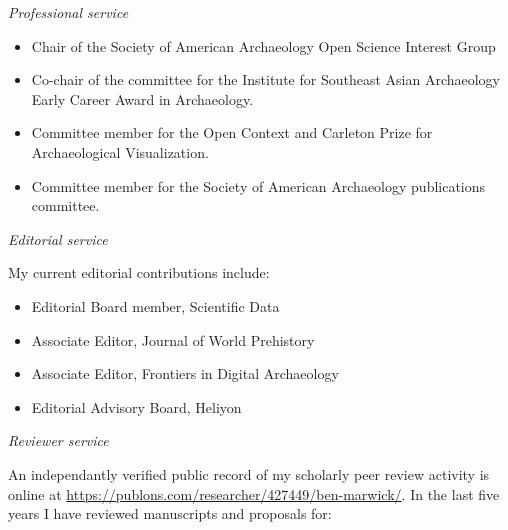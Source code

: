 \medskip

\noindent\emph{Professional service\vspace{0.01in}}

\medskip

\begin{itemize}[noitemsep, font=$\bullet$\scshape\bfseries]

\item Chair of the Society of American Archaeology Open Science Interest Group

\item Co-chair of the committee for the Institute for Southeast Asian Archaeology Early Career Award in Archaeology.

\item Committee member for the Open Context and Carleton Prize for Archaeological Visualization.

\item Committee member for the Society of American Archaeology publications committee.

\end{itemize}

\medskip

\noindent\emph{Editorial service\vspace{0.01in}}

\medskip

My current editorial contributions include:

\begin{itemize}[noitemsep, font=$\bullet$\scshape\bfseries]
\item Editorial Board member, Scientific Data
\item Associate Editor, Journal of World Prehistory
\item Associate Editor, Frontiers in Digital Archaeology
\item Editorial Advisory Board, Heliyon
\end{itemize}

\medskip

\noindent\emph{Reviewer service\vspace{0.01in}}

\medskip

An independantly verified public record of my scholarly peer review activity is online at \href{https://publons.com/researcher/427449/ben-marwick}{https://publons.com/researcher/427449/ben-marwick/}. In the last five years I have reviewed manuscripts and proposals for:


